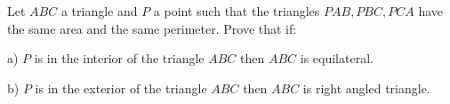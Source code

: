 Let $ABC$ a triangle and $P$ a point such that the triangles $PAB, PBC, PCA$ have the same area and the same perimeter. Prove that if:

a) $P$ is in the interior of the triangle $ABC$ then $ABC$ is equilateral.

b) $P$ is in the exterior of the triangle $ABC$ then $ABC$ is right angled triangle.